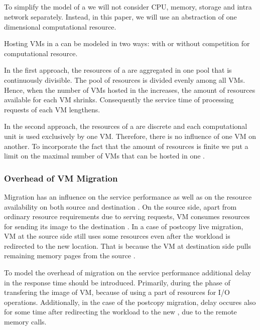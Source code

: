 \subsection{\Dc}
To simplify the model of a \dc we will not consider CPU, memory, storage and intra \dc network separately.
Instead, in this paper, we will use an abstraction of one dimensional computational resource.

Hosting VMs in a \dc can be modeled in two ways: with or without competition for computational resource.

In the first approach, the resources of a \dc are aggregated in one pool that is continuously divisible.
The pool of resources is divided evenly among all VMs.
Hence, when the number of VMs hosted in the \dc increases, the amount of resources available for each VM shrinks.
Consequently the service time of processing requests of each VM lengthens.

In the second approach, the resources of a \dc are discrete and each computational unit is used exclusively by one VM.
Therefore, there is no influence of one VM on another.
To incorporate the fact that the amount of resources is finite we put a limit on the maximal number of VMs that can be hosted in one \dc.

\subsubsection{Overhead of VM Migration}
Migration has an influence on the service performance as well as on the resource availability on both source and destination \dc.
On the source side, apart from ordinary resource requirements due to serving requests, VM consumes resources for sending its image to the destination \dc.
In a case of postcopy live migration, VM at the source side still uses some resources even after the workload is redirected to the new location.
That is because the VM at destination side pulls remaining memory pages from the source \dc.


To model the overhead of migration on the service performance additional delay in the response time should be introduced.
Primarily, during the phase of transfering the image of VM, because of using a part of resources for I/O operations.
Additionally, in the case of the postcopy migration, delay occures also for some time after redirecting the workload to the new \dc, due to the remote memory calls.

